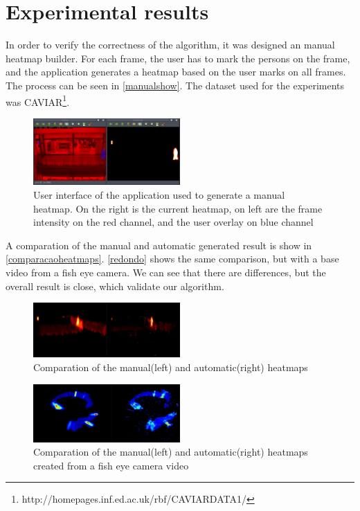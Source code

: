 \documentclass[10pt, conference]{IEEEtran}
\begin{document}
	\section{Experimental results}
	In order to verify the correctness of the algorithm, it was designed an manual heatmap builder. For each frame, the user has to mark the persons on the frame, and the application generates a heatmap based on the user marks on all frames. The process can be seen in \autoref{manualshow}. The dataset used for the experiments was CAVIAR\footnote{http://homepages.inf.ed.ac.uk/rbf/CAVIARDATA1/}.
	\begin{figure}[H]
		\centering
		\includegraphics[width=0.5\textwidth]{figs/manualshow}
		\caption{User interface of the application used to generate a manual heatmap. On the right is the current heatmap, on left are the frame intensity on the red channel, and the user overlay on blue channel}
		\label{manualshow}
	\end{figure}
	A comparation of the manual and automatic generated result is show in \autoref{comparacaoheatmaps}. \autoref{redondo} shows the same comparison, but with a base video from a fish eye camera. We can see that there are differences, but the overall result is close, which validate our algorithm.
	\begin{figure}[H]
		\centering
		\includegraphics[width=0.5\textwidth]{figs/comparacaoheatmaps}
		\caption{Comparation of the manual(left) and automatic(right) heatmaps}
		\label{comparacaoheatmaps}
	\end{figure}
	\begin{figure}[H]
		\centering
		\includegraphics[width=0.5\textwidth]{figs/redondo}
		\caption{Comparation of the manual(left) and automatic(right) heatmaps created from a fish eye camera video}
		\label{redondo}
	\end{figure}
	
\end{document}
